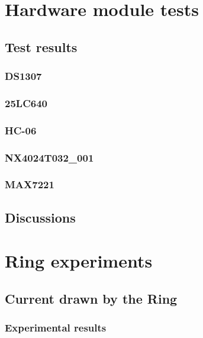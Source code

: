 \section{Hardware module tests}
\subsection{Test results}
\subsubsection{DS1307}
\subsubsection{25LC640}
\subsubsection{HC-06}
\subsubsection{NX4024T032\_001}
\subsubsection{MAX7221}
\subsection{Discussions}

\section{Ring experiments}

\subsection{Current drawn by the Ring}
\subsubsection{Experimental results}

